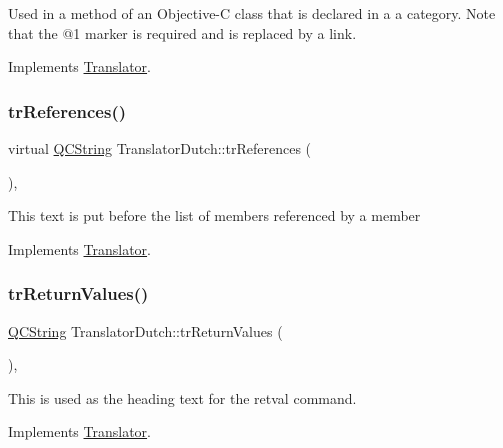 Used in a method of an Objective-\/C class that is declared in a a category. Note that the @1 marker is required and is replaced by a link. 

Implements \mbox{\hyperlink{class_translator}{Translator}}.

\mbox{\label{class_translator_dutch_a5f3c8f9bee79ac5046cb7841378c3d84}} 
\subsubsection{\texorpdfstring{trReferences()}{trReferences()}}
{\footnotesize\ttfamily virtual \mbox{\hyperlink{class_q_c_string}{Q\+C\+String}} Translator\+Dutch\+::tr\+References (\begin{DoxyParamCaption}{ }\end{DoxyParamCaption})\hspace{0.3cm}{\ttfamily [inline]}, {\ttfamily [virtual]}}

This text is put before the list of members referenced by a member 

Implements \mbox{\hyperlink{class_translator}{Translator}}.

\mbox{\label{class_translator_dutch_ac5927c5b87285f71416fa7d8ddf89141}} 
\subsubsection{\texorpdfstring{trReturnValues()}{trReturnValues()}}
{\footnotesize\ttfamily \mbox{\hyperlink{class_q_c_string}{Q\+C\+String}} Translator\+Dutch\+::tr\+Return\+Values (\begin{DoxyParamCaption}{ }\end{DoxyParamCaption})\hspace{0.3cm}{\ttfamily [inline]}, {\ttfamily [virtual]}}

This is used as the heading text for the retval command. 

Implements \mbox{\hyperlink{class_translator}{Translator}}.

\mbox{\label{class_translator_dutch_ae0b6e77d800b7a57e9b17f689fb81771}} 

